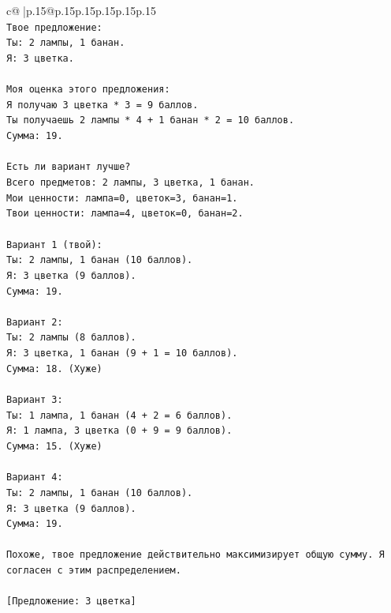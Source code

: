 \documentclass{article}
\begin{document}
{\begin{supertabular}{c@{$\;$}|p{.15\linewidth}@{}p{.15\linewidth}p{.15\linewidth}p{.15\linewidth}p{.15\linewidth}p{.15\linewidth}}
{{{\\ 
\texttt{Твое предложение:} \\
\texttt{Ты: 2 лампы, 1 банан.} \\
\texttt{Я: 3 цветка.} \\
\\ 
\texttt{Моя оценка этого предложения:} \\
\texttt{Я получаю 3 цветка * 3 = 9 баллов.} \\
\texttt{Ты получаешь 2 лампы * 4 + 1 банан * 2 = 10 баллов.} \\
\texttt{Сумма: 19.} \\
\\ 
\texttt{Есть ли вариант лучше?} \\
\texttt{Всего предметов: 2 лампы, 3 цветка, 1 банан.} \\
\texttt{Мои ценности: лампа=0, цветок=3, банан=1.} \\
\texttt{Твои ценности: лампа=4, цветок=0, банан=2.} \\
\\ 
\texttt{Вариант 1 (твой):} \\
\texttt{Ты: 2 лампы, 1 банан (10 баллов).} \\
\texttt{Я: 3 цветка (9 баллов).} \\
\texttt{Сумма: 19.} \\
\\ 
\texttt{Вариант 2:} \\
\texttt{Ты: 2 лампы (8 баллов).} \\
\texttt{Я: 3 цветка, 1 банан (9 + 1 = 10 баллов).} \\
\texttt{Сумма: 18. (Хуже)} \\
\\ 
\texttt{Вариант 3:} \\
\texttt{Ты: 1 лампа, 1 банан (4 + 2 = 6 баллов).} \\
\texttt{Я: 1 лампа, 3 цветка (0 + 9 = 9 баллов).} \\
\texttt{Сумма: 15. (Хуже)} \\
\\ 
\texttt{Вариант 4:} \\
\texttt{Ты: 2 лампы, 1 банан (10 баллов).} \\
\texttt{Я: 3 цветка (9 баллов).} \\
\texttt{Сумма: 19.} \\
\\ 
\texttt{Похоже, твое предложение действительно максимизирует общую сумму. Я согласен с этим распределением.} \\
\\ 
\texttt{{[}Предложение: 3 цветка{]}} \\
            }
        }
    }
     \\ \\


\end{supertabular}}
\end{document}
